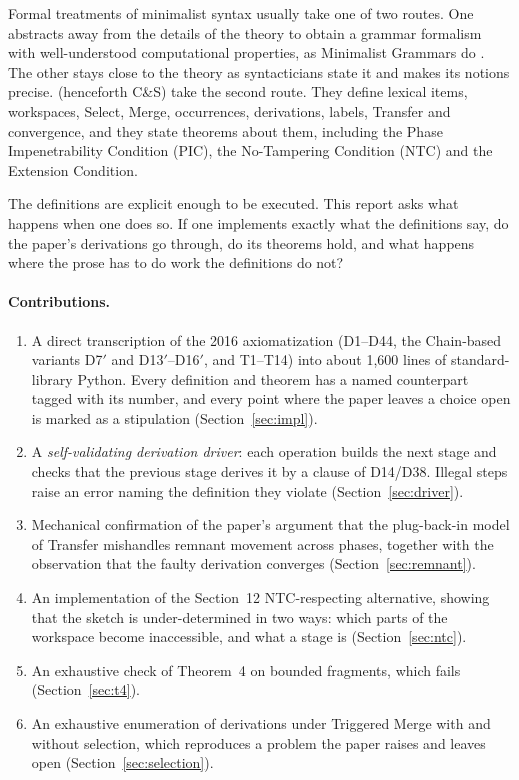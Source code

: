 \documentclass[11pt]{article}
\newcommand{\Def}[1]{D#1}
\newcommand{\Thm}[1]{T#1}
\theoremstyle{definition}
\theoremstyle{plain}
\begin{document}
Formal treatments of minimalist syntax usually take one of two routes. One
abstracts away from the details of the theory to obtain a grammar formalism
with well-understood computational properties, as Minimalist Grammars do
\citep{Stabler1997,Stabler2011}. The other stays close to the theory as
syntacticians state it and makes its notions precise.
\citet{CollinsStabler2016} (henceforth C\&S) take the second route. They
define lexical items, workspaces, Select, Merge, occurrences, derivations,
labels, Transfer and convergence, and they state theorems about them,
including the Phase Impenetrability Condition (PIC), the No-Tampering
Condition (NTC) and the Extension Condition.

The definitions are explicit enough to be executed. This report asks what
happens when one does so. If one implements exactly what the definitions say,
do the paper's derivations go through, do its theorems hold, and what
happens where the prose has to do work the definitions do not?

\paragraph{Contributions.}
\begin{enumerate}[leftmargin=*,itemsep=2pt]
\item A direct transcription of the 2016 axiomatization (\Def{1}--\Def{44},
  the Chain-based variants \Def{7}$'$ and \Def{13}$'$--\Def{16}$'$, and
  \Thm{1}--\Thm{14}) into about 1{,}600 lines of standard-library Python. Every
  definition and theorem has a named counterpart tagged with its number, and
  every point where the paper leaves a choice open is marked as a stipulation
  (Section~\ref{sec:impl}).
\item A \emph{self-validating derivation driver}: each operation builds the
  next stage and checks that the previous stage derives it by a clause of
  \Def{14}/\Def{38}. Illegal steps raise an error naming the definition they
  violate (Section~\ref{sec:driver}).
\item Mechanical confirmation of the paper's argument that the plug-back-in
  model of Transfer mishandles remnant movement across phases, together with
  the observation that the faulty derivation converges
  (Section~\ref{sec:remnant}).
\item An implementation of the Section~12 NTC-respecting alternative, showing
  that the sketch is under-determined in two ways: which parts of the
  workspace become inaccessible, and what a stage is
  (Section~\ref{sec:ntc}).
\item An exhaustive check of Theorem~4 on bounded fragments, which fails
  (Section~\ref{sec:t4}).
\item An exhaustive enumeration of derivations under Triggered Merge with and
  without selection, which reproduces a problem the paper raises and leaves
  open (Section~\ref{sec:selection}).
\end{enumerate}
\end{document}
